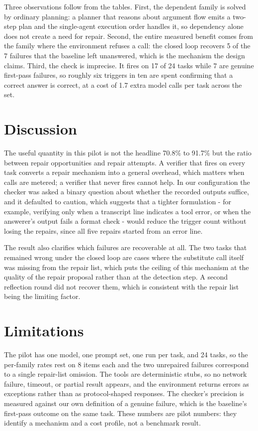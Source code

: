 \documentclass[runningheads,a4paper]{llncs}
\begin{document}
Three observations follow from the tables. First, the dependent family is solved by ordinary planning: a planner that reasons about argument flow emits a two-step plan and the single-agent execution order handles it, so dependency alone does not create a need for repair. Second, the entire measured benefit comes from the family where the environment refuses a call: the closed loop recovers 5 of the 7 failures that the baseline left unanswered, which is the mechanism the design claims. Third, the check is imprecise. It fires on 17 of 24 tasks while 7 are genuine first-pass failures, so roughly six triggers in ten are spent confirming that a correct answer is correct, at a cost of 1.7 extra model calls per task across the set.

\section{Discussion}

The useful quantity in this pilot is not the headline 70.8\% to 91.7\% but the ratio between repair opportunities and repair attempts. A verifier that fires on every task converts a repair mechanism into a general overhead, which matters when calls are metered; a verifier that never fires cannot help. In our configuration the checker was asked a binary question about whether the recorded outputs suffice, and it defaulted to caution, which suggests that a tighter formulation - for example, verifying only when a transcript line indicates a tool error, or when the answerer's output fails a format check - would reduce the trigger count without losing the repairs, since all five repairs started from an error line.

The result also clarifies which failures are recoverable at all. The two tasks that remained wrong under the closed loop are cases where the substitute call itself was missing from the repair list, which puts the ceiling of this mechanism at the quality of the repair proposal rather than at the detection step. A second reflection round did not recover them, which is consistent with the repair list being the limiting factor.

\section{Limitations}

The pilot has one model, one prompt set, one run per task, and 24 tasks, so the per-family rates rest on 8 items each and the two unrepaired failures correspond to a single repair-list omission. The tools are deterministic stubs, so no network failure, timeout, or partial result appears, and the environment returns errors as exceptions rather than as protocol-shaped responses. The checker's precision is measured against our own definition of a genuine failure, which is the baseline's first-pass outcome on the same task. These numbers are pilot numbers: they identify a mechanism and a cost profile, not a benchmark result.
\end{document}
